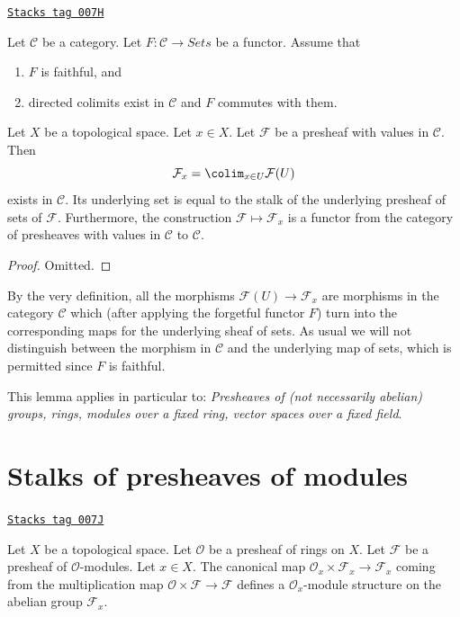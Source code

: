 \begin{lemma}
\label{sheaves-lemma-stalk-presheaf-values-in-category}
\href{https://stacks.math.columbia.edu/tag/007H}{\texttt{Stacks tag 007H}}

Let $\mathcal{C}$ be a category. Let $F : \mathcal{C} \to \textit{Sets}$
be a functor. Assume that
\begin{enumerate}
\item $F$ is faithful, and
\item directed colimits exist in $\mathcal{C}$ and $F$ commutes with
them.
\end{enumerate}
Let $X$ be a topological space. Let $x \in X$. Let $\mathcal{F}$
be a presheaf with values in $\mathcal{C}$.
Then
$$
\mathcal{F}_x = \colim_{x\in U} \mathcal{F}(U)
$$
exists in $\mathcal{C}$. Its underlying set is equal to the
stalk of the underlying presheaf of sets of $\mathcal{F}$.
Furthermore, the construction $\mathcal{F} \mapsto \mathcal{F}_x$
is a functor from the category of presheaves with values in
$\mathcal{C}$ to $\mathcal{C}$.
\end{lemma}

\begin{proof}
Omitted.
\end{proof}

By the very definition, all the morphisms $\mathcal{F}(U)
\to \mathcal{F}_x$ are morphisms in the category $\mathcal{C}$
which (after applying the forgetful functor $F$) turn into
the corresponding maps for the underlying sheaf of sets.
As usual we will not distinguish between the morphism
in $\mathcal{C}$ and the underlying map of sets, which
is permitted since $F$ is faithful.

\medskip\noindent
This lemma applies in particular to:
{\it Presheaves of (not necessarily abelian) groups, rings, modules
over a fixed ring, vector spaces over a fixed field}.

\section{Stalks of presheaves of modules}
\label{sheaves-section-stalk-presheaves-modules}
\begin{lemma}
\label{sheaves-lemma-stalk-module}
\href{https://stacks.math.columbia.edu/tag/007J}{\texttt{Stacks tag 007J}}

Let $X$ be a topological space.
Let $\mathcal{O}$ be a presheaf of rings on $X$.
Let $\mathcal{F}$ be a presheaf of $\mathcal{O}$-modules.
Let $x \in X$.
The canonical map $\mathcal{O}_x \times \mathcal{F}_x
\to \mathcal{F}_x$ coming from the multiplication map
$\mathcal{O} \times \mathcal{F} \to \mathcal{F}$ defines
a $\mathcal{O}_x$-module structure on the abelian group
$\mathcal{F}_x$.
\end{lemma}

